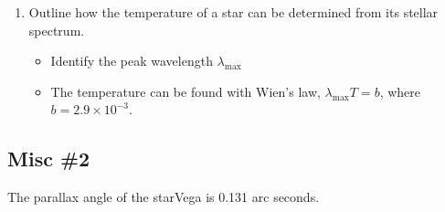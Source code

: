 \documentclass[a4paper,12pt]{article}
\begin{document}
\begin{enumerate}[label=(\alph*)]
        \begin{enumerate}[label=(\roman*)]
          \item Outline how the temperature of a star can be determined from its stellar spectrum.
                \begin{itemize}
                  \item Identify the peak wavelength $\lambda_{\max}$
                  \item The temperature can be found with Wien's law, $\lambda_{\max}T = b$, where $b =  2.9\times 10^{-3}$.
                \end{itemize}
        \end{enumerate}

\end{enumerate}

\pagebreak

\subsection{Misc \#2}

The parallax angle of the starVega is 0.131 arc seconds.
\end{document}
